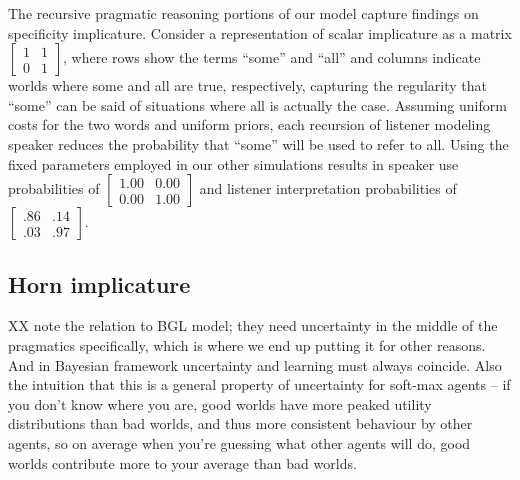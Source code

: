 \documentclass{article} %
\begin{document}
The recursive pragmatic reasoning portions of our model capture findings on specificity implicature. Consider a representation of scalar implicature as a matrix 
$\left[
    \begin{array}{cc}
      1 & 1 \\
      0 & 1
    \end{array} 
  \right]$,
where rows show the terms ``some'' and ``all'' and columns indicate worlds where {\sc some} and {\sc all} are true, respectively, capturing the regularity that ``some'' can be said of situations where {\sc all} is actually the case. Assuming uniform costs for the two words and uniform priors, each recursion of listener modeling speaker reduces the probability that ``some'' will be used to refer to {\sc all}. Using the fixed parameters employed in our other simulations results in speaker use probabilities of 
$\left[
    \begin{array}{cc}
      1.00 & 0.00 \\
      0.00 & 1.00
    \end{array} 
  \right]$
and listener interpretation probabilities of 
$\left[
    \begin{array}{cc}
      .86 & .14 \\
      .03 & .97
    \end{array} 
  \right]$.

%
%

\subsection{Horn implicature}

XX note the relation to BGL model; they need uncertainty in the middle of the pragmatics specifically, which is where we end up putting it for other reasons. And in Bayesian framework uncertainty and learning must always coincide. Also the intuition that this is a general property of uncertainty for soft-max agents -- if you don't know where you are, good worlds have more peaked utility distributions than bad worlds, and thus more consistent behaviour by other agents, so on average when you're guessing what other agents will do, good worlds contribute more to your average than bad worlds.
\end{document}
